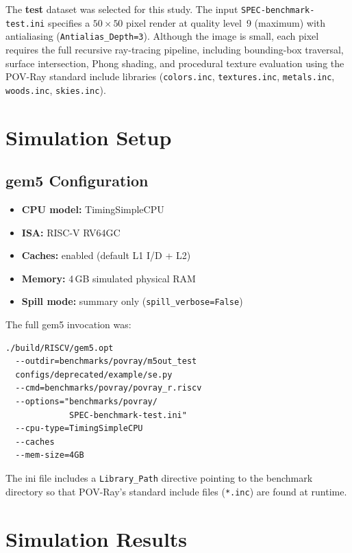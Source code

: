 \documentclass[conference]{IEEEtran}
\begin{document}
The \textbf{test} dataset was selected for this study. The input
\texttt{SPEC-benchmark-test.ini} specifies a $50\times50$ pixel
render at quality level~9 (maximum) with antialiasing
(\texttt{Antialias\_Depth=3}). Although the image is small, each
pixel requires the full recursive ray-tracing pipeline, including
bounding-box traversal, surface intersection, Phong shading, and
procedural texture evaluation using the POV-Ray standard include
libraries (\texttt{colors.inc}, \texttt{textures.inc},
\texttt{metals.inc}, \texttt{woods.inc}, \texttt{skies.inc}).

\section{Simulation Setup}

\subsection{gem5 Configuration}

\begin{itemize}
    \item \textbf{CPU model:}   TimingSimpleCPU
    \item \textbf{ISA:}         RISC-V RV64GC
    \item \textbf{Caches:}      enabled (default L1 I/D + L2)
    \item \textbf{Memory:}      4\,GB simulated physical RAM
    \item \textbf{Spill mode:}  summary only (\texttt{spill\_verbose=False})
\end{itemize}

The full gem5 invocation was:

\begin{verbatim}
./build/RISCV/gem5.opt
  --outdir=benchmarks/povray/m5out_test
  configs/deprecated/example/se.py
  --cmd=benchmarks/povray/povray_r.riscv
  --options="benchmarks/povray/
             SPEC-benchmark-test.ini"
  --cpu-type=TimingSimpleCPU
  --caches
  --mem-size=4GB
\end{verbatim}

The ini file includes a \texttt{Library\_Path} directive pointing to
the benchmark directory so that POV-Ray's standard include files
(\texttt{*.inc}) are found at runtime.

\section{Simulation Results}
\end{document}

